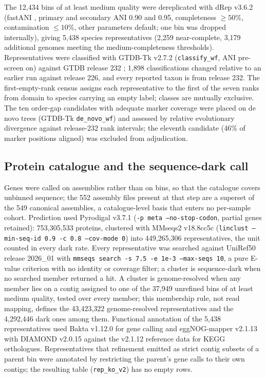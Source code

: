 \documentclass[11pt]{article}
\begin{document}
The 12{,}434 bins of at least medium quality were dereplicated with dRep v3.6.2 \citep{olm2017drep}
(fastANI \citep{jain2018fastani}, primary and secondary ANI 0.90 and 0.95, completeness $\geq 50\%$,
contamination $\leq 10\%$, other parameters default; one bin was dropped internally), giving 5{,}438
species representatives (2{,}259 near-complete, 3{,}179 additional genomes meeting the medium-completeness thresholds). Representatives were classified with
GTDB-Tk v2.7.2 \citep{chaumeil2022gtdbtk} (\texttt{classify\_wf}, ANI pre-screen on) against GTDB
release 232 \citep{parks2022gtdb}; 1{,}898 classifications changed relative to an earlier run
against release 226, and every reported taxon is from release 232. The first-empty-rank census
assigns each representative to the first of the seven ranks from domain to species carrying an empty
label; classes are mutually exclusive. The ten order-gap candidates with adequate marker coverage
were placed on de novo trees (GTDB-Tk \texttt{de\_novo\_wf}) and assessed by relative evolutionary
divergence against release-232 rank intervals; the eleventh candidate (46\% of marker positions
aligned) was excluded from adjudication.

\subsection*{Protein catalogue and the sequence-dark call}
Genes were called on assemblies rather than on bins, so that the catalogue covers unbinned sequence;
the 552 assembly files present at that step are a superset of the 549 canonical assemblies, a
catalogue-level basis that enters no per-sample cohort. Prediction used Pyrodigal v3.7.1 \citep{larralde2022pyrodigal,hyatt2010prodigal}
(\texttt{-p meta --no-stop-codon}, partial genes retained): 753{,}305{,}533 proteins, clustered with
MMseqs2 v18.8cc5c \citep{steinegger2017mmseqs2,steinegger2018linclust} (\texttt{linclust
--min-seq-id 0.9 -c 0.8 --cov-mode 0}) into 449{,}265{,}306 representatives, the unit counted in
every dark rate. Every representative was searched against UniRef50 release 2026\_01
\citep{suzek2015uniref} with \texttt{mmseqs search -s 7.5 -e 1e-3 --max-seqs 10}, a pure E-value
criterion with no identity or coverage filter; a cluster is sequence-dark when no searched member
returned a hit. A cluster is genome-resolved when any member lies on a contig assigned to one of the
37{,}949 unrefined bins of at least medium quality, tested over every member; this membership rule,
not read mapping, defines the 43{,}423{,}322 genome-resolved representatives and the 4{,}292{,}446
dark ones among them. Functional annotation of the 5{,}438 representatives used Bakta v1.12.0
\citep{schwengers2021bakta} for gene calling and eggNOG-mapper v2.1.13 \citep{cantalapiedra2021eggnog}
with DIAMOND v2.0.15 \citep{buchfink2021diamond} against the v2.1.12 reference data for KEGG
orthologues. Representatives that refinement emitted as strict contig subsets of a parent bin were
annotated by restricting the parent's gene calls to their own contigs; the resulting table
(\texttt{rep\_ko\_v2}) has no empty rows.
\end{document}
